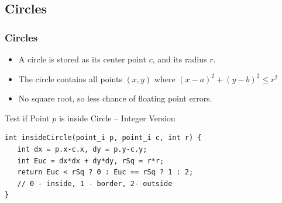 \subsection{Circles}
\begin{frame}[fragile]
  \frametitle{Circles}
  \begin{itemize}
  \item A circle is stored as its center point $c$, and its radius $r$.\medskip

  \item The circle contains all points $(x,y)$ where $(x-a)^2+(y-b)^2 \leq r^2$\medskip

  \item No square root, so less chance of floating point errors.
  \end{itemize}\bigskip

  \begin{exampleblock}{Test if Point $p$ is inside Circle -- Integer Version}
    {\smaller
\begin{verbatim}
int insideCircle(point_i p, point_i c, int r) {
   int dx = p.x-c.x, dy = p.y-c.y;
   int Euc = dx*dx + dy*dy, rSq = r*r;
   return Euc < rSq ? 0 : Euc == rSq ? 1 : 2;
   // 0 - inside, 1 - border, 2- outside
}
\end{verbatim}
}
  \end{exampleblock}
\end{frame}


%
%
%



